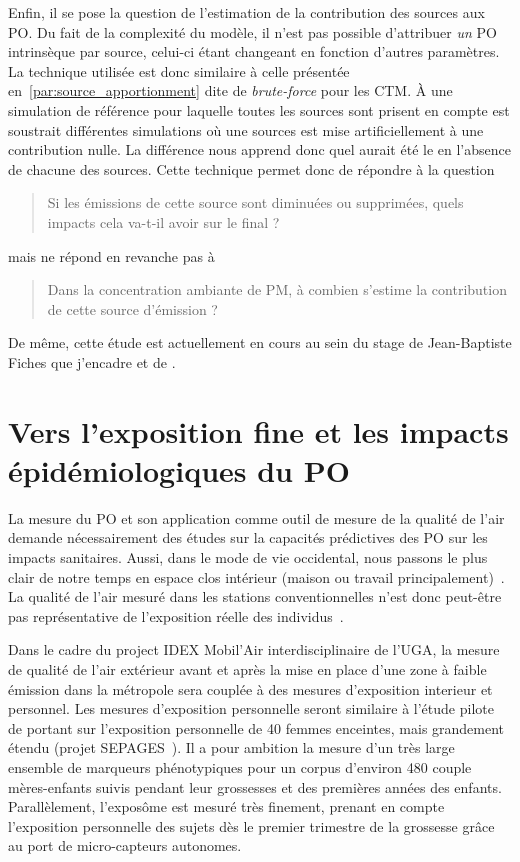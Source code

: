 Enfin, il se pose la question de l'estimation de la contribution des sources aux PO. Du
fait de la complexité du modèle, il n'est pas possible d'attribuer \emph{un} PO
intrinsèque par source, celui-ci étant changeant en fonction d'autres paramètres.
La technique utilisée est donc similaire à celle présentée
en~\ref{par:source_apportionment} dite de \textit{brute-force} pour les CTM. À une
simulation de référence pour laquelle toutes les sources sont prisent en compte est
soustrait différentes simulations où une sources est mise artificiellement à une
contribution nulle.  La différence nous apprend donc quel aurait été le \POv{} en
l'absence de chacune des sources.
Cette technique permet donc de répondre à la question
\begin{quote}
   Si les émissions de cette source sont diminuées ou supprimées, quels impacts cela va-t-il
   avoir sur le \POv{} final ?
\end{quote}
mais ne répond en revanche pas à
\begin{quote}
   Dans la concentration ambiante de PM, à combien s'estime la contribution de cette source
   d'émission ?
\end{quote}

De même, cette étude est actuellement en cours au sein du stage de Jean-Baptiste Fiches
que j'encadre et de \cite{borlazaUrbaninprep.}.

\section{Vers l'exposition fine et les impacts épidémiologiques du PO}

La mesure du PO et son application comme outil de mesure de la qualité de l'air demande
nécessairement des études sur la capacités prédictives des PO sur les impacts sanitaires.
Aussi, dans le mode de vie occidental, nous passons le plus clair de notre temps en espace
clos intérieur (maison ou travail
principalement)~\autocite{netheryTime2009,ouidirEstimation2015}. La qualité de l'air
mesuré dans les stations conventionnelles n'est donc peut-être pas représentative de
l'exposition réelle des individus~\autocite{sauvainOxidative2015}.

Dans le cadre du project IDEX Mobil'Air interdisciplinaire de l'UGA, la mesure de qualité
de l'air extérieur avant et après la mise en place d'une zone à faible émission dans la
métropole sera couplée à des mesures d'exposition interieur et personnel. Les mesures
d'exposition personnelle seront similaire à l'étude pilote de \cite{ouidirEstimation2015}
portant sur l'exposition personnelle de 40 femmes enceintes, mais grandement étendu (projet
SEPAGES~\autocite{lyon-caenDeciphering2019}). Il a pour ambition la mesure d'un très large
ensemble de marqueurs phénotypiques pour un corpus d'environ 480 couple mères-enfants
suivis pendant leur grossesses et des premières années des enfants. Parallèlement,
l'exposôme est mesuré très finement, prenant en compte l'exposition personnelle des
sujets dès le premier trimestre de la grossesse grâce au port de micro-capteurs autonomes.

